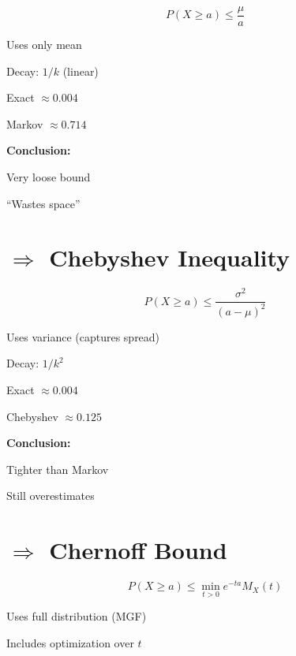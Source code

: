 \documentclass{article}
\begin{document}
\[
P(X \ge a) \le \frac{\mu}{a}
\]

\vspace{0.2cm}

Uses only mean  

Decay: $1/k$ (linear)  

Exact $\approx 0.004$  

Markov $\approx 0.714$  

\vspace{0.2cm}

\textbf{Conclusion:}

Very loose bound  

``Wastes space''  

\vspace{0.6cm}


\section*{$\Rightarrow$ Chebyshev Inequality}

\[
P(X \ge a) \le \frac{\sigma^2}{(a-\mu)^2}
\]

\vspace{0.2cm}

Uses variance (captures spread)  

Decay: $1/k^2$  

Exact $\approx 0.004$  

Chebyshev $\approx 0.125$  

\vspace{0.2cm}

\textbf{Conclusion:}

Tighter than Markov  

Still overestimates  

\vspace{0.6cm}


\section*{$\Rightarrow$ Chernoff Bound}

\[
P(X \ge a) \le \min_{t>0} e^{-ta} M_X(t)
\]

\vspace{0.2cm}

Uses full distribution (MGF)  

Includes optimization over $t$  
\end{document}
